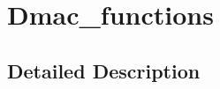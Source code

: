 \hypertarget{group__dmac__functions}{}\section{Dmac\+\_\+functions}
\label{group__dmac__functions}


\subsection{Detailed Description}
